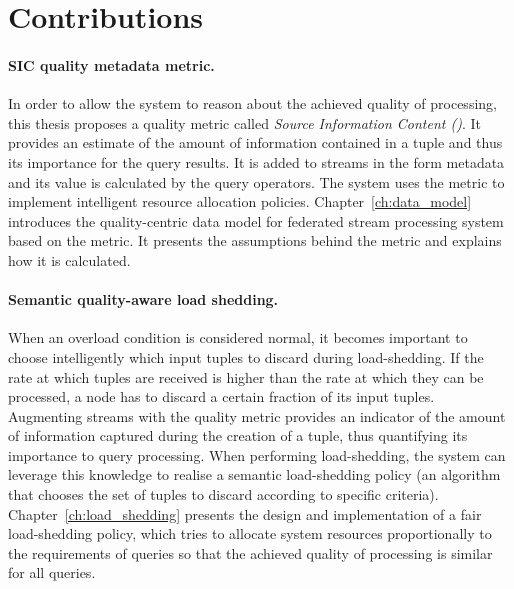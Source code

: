 \section{Contributions}
\vspace{-3pt}
\paragraph{SIC quality metadata metric.}
In order to allow the system to reason about the achieved quality of processing, this thesis
proposes a quality metric called \emph{Source Information Content (\sic)}. 
It provides an estimate of the amount of information contained in a tuple and
thus its importance for the query results. 
It is added to streams in the form metadata and its value is calculated by the query operators.
The system uses the \sic metric to implement intelligent resource allocation policies.
Chapter~\ref{ch:data_model} introduces the quality-centric data model for federated stream processing
system based on the \sic metric. It presents the assumptions behind the \sic metric and explains
how it is calculated.
\vspace{-3pt}
\paragraph{Semantic quality-aware load shedding.}
When an overload condition is considered normal, it becomes important to choose intelligently which input
tuples to discard during \mbox{load-shedding}. 
If the rate at which tuples are received is higher than the rate at which they can be
processed, a node has to discard a certain fraction of its input
tuples. 
Augmenting streams with the \sic quality metric provides an indicator of the amount of
information captured during the creation of a tuple, thus quantifying its importance to query processing.
When performing \mbox{load-shedding}, the system can leverage this knowledge to realise a semantic
load-shedding policy (\ie an algorithm that chooses the set of tuples to discard according to
specific criteria). 
Chapter~\ref{ch:load_shedding} presents the design and implementation of a fair load-shedding policy,
which tries to allocate system resources proportionally to the requirements of queries so that the
achieved quality of processing is similar for all queries.
\vspace{-3pt}
